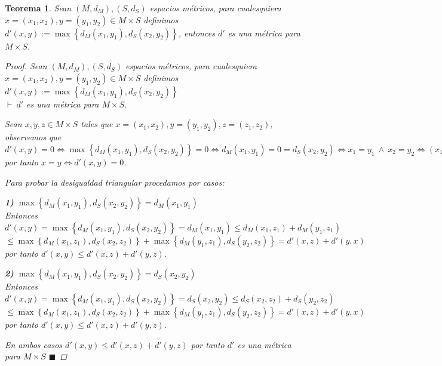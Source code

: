 \documentclass[oneside]{book} %
\theoremstyle{Teorema}
\newtheorem{Teorema}[Definicion]{Teorema}
\theoremstyle{Ejemplos}
\theoremstyle{[Obs]}
\renewcommand{\{}{\left\lbrace} %
\renewcommand{\}}{\right\rbrace} %
\newcommand{\y}{\ \wedge\ } %
\renewcommand{\qed}{$\blacksquare$} %
\newcommand{\pd}{$\vdash\ $} %
\begin{document}
			\begin{Teorema}\setlength{\parindent}{0em}
				
				Sean $(M, d_M), (S, d_S)$ espacios métricos, para cualesquiera $x = (x_1, x_2), y = (y_1, y_2) \in M \times S$ definimos $d'(x, y) := \max\{ d_M(x_1, y_1), d_S(x_2, y_2) \}$, entonces $d'$ es una métrica para $M \times S$.

				\begin{proof}
					
					Sean $(M, d_M), (S, d_S)$ espacios métricos, para cualesquiera $x = (x_1, x_2), y = (y_1, y_2) \in M \times S$ definimos $d'(x, y) := \max\{ d_M(x_1, y_1), d_S(x_2, y_2) \}$ \\
					\pd $d'$ es una métrica para $M \times S$.

					Sean $x, y, z \in M \times S$ tales que $x = (x_1, x_2), y = (y_1, y_2), z = (z_1, z_2)$, observemos que $d'(x, y) = 0 \Leftrightarrow \max\{ d_M(x_1, y_1), d_S(x_2, y_2) \} = 0 \Leftrightarrow d_M(x_1, y_1) = 0 = d_S(x_2, y_2) \Leftrightarrow x_1 = y_1 \y x_2 = y_2 \Leftrightarrow (x_1, x_2) = (y_2, y_2) \Leftrightarrow x = y$ por tanto $x = y \Leftrightarrow d'(x, y) = 0$.

					Para probar la desigualdad triangular procedamos por casos:

					\textbf{1)} $\max\{ d_M(x_1, y_1), d_S(x_2, y_2) \} = d_M(x_1, y_1)$ \\
					Entonces $d'(x, y) = \max\{ d_M(x_1, y_1), d_S(x_2, y_2) \} = d_M(x_1, y_1) \leq d_M(x_1, z_1) + d_M(y_1, z_1)$ \\ $\leq \max\{ d_M(x_1, z_1), d_S(x_2, z_2) \} + \max\{ d_M(y_1, z_1), d_S(y_2, z_2) \} = d'(x, z) + d'(y, x)$ por tanto $d'(x, y) \leq d'(x, z) + d'(y, z)$.

					\textbf{2)} $\max\{ d_M(x_1, y_1), d_S(x_2, y_2) \} = d_S(x_2, y_2)$ \\
					Entonces $d'(x, y) = \max\{ d_M(x_1, y_1), d_S(x_2, y_2) \} = d_S(x_2, y_2) \leq d_S(x_2, z_2) + d_S(y_2, z_2)$ \\ $\leq \max\{ d_M(x_1, z_1), d_S(x_2, z_2) \} + \max\{ d_M(y_1, z_1), d_S(y_2, z_2) \} = d'(x, z) + d'(y, x)$ por tanto $d'(x, y) \leq d'(x, z) + d'(y, z)$.

					En ambos casos $d'(x, y) \leq d'(x, z) + d'(y, z)$ por tanto $d'$ es una métrica para $M \times S$ \qed

				\end{proof}

			\end{Teorema}
\end{document}
